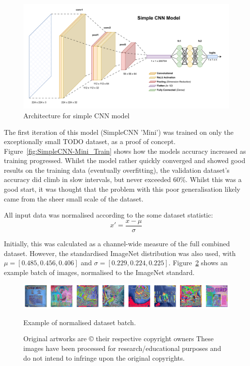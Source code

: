                 \begin{figure}[htbp]
                    \centering
                    \includegraphics[width=\linewidth]{images/BabyOuroboros.pdf}
                    \caption{Architecture for simple CNN model}
                    \label{fig:BabyOuroboros}
                \end{figure}
    
                The first iteration of this model (SimpleCNN 'Mini') was trained on only the exceptionally small TODO dataset, as a proof of concept. Figure~\ref{fig:SimpleCNN-Mini_Train} shows how the models accuracy increased as training progressed. Whilst the model rather quickly converged and showed good results on the training data (eventually overfitting), the validation dataset's accuracy did climb in slow intervals, but never exceeded 60\%. Whilst this was a good start, it was thought that the problem with this poor generalisation likely came from the sheer small scale of the dataset.
    
                All input data was normalised according to the some dataset statistic:
                    \[
                    x' = \frac{x - \mu}{\sigma}
                    \]
    
                Initially, this was calculated as a channel-wide measure of the full combined dataset. However, the standardised ImageNet distribution was also used, with \( \mu = [0.485, 0.456, 0.406] \) and \( \sigma = [0.229, 0.224, 0.225] \). Figure~\ref{fig:normalisedArts} shows an example batch of images, normalised to the ImageNet standard.
        
                \begin{figure}[h]
                    \centering
                    \includegraphics[width=\textwidth]{images/NormalisedArts.png}
                    \caption{Example of normalised dataset batch.}
                    \label{fig:normalisedArts}
                    \caption*{
                        Original artworks are © their respective copyright owners
                        \footnotesize These images have been processed for research/educational purposes and do not intend to infringe upon the original copyrights.
                    }
                \end{figure}
    
